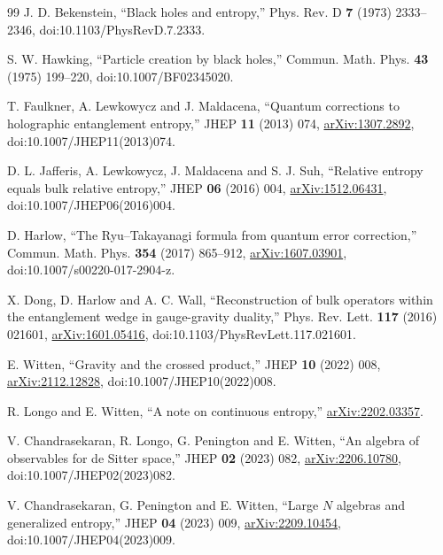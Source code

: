 \documentclass[12pt]{article}
\theoremstyle{definition}
\theoremstyle{remark}
\begin{document}
\begin{thebibliography}{99}
J. D. Bekenstein,
``Black holes and entropy,'' Phys. Rev. D \textbf{7} (1973) 2333--2346,
doi:10.1103/PhysRevD.7.2333.

S. W. Hawking,
``Particle creation by black holes,''
Commun. Math. Phys. \textbf{43} (1975) 199--220,
doi:10.1007/BF02345020.

T. Faulkner, A. Lewkowycz and J. Maldacena,
``Quantum corrections to holographic entanglement entropy,''
JHEP \textbf{11} (2013) 074,
\href{https://arxiv.org/abs/1307.2892}{arXiv:1307.2892},
doi:10.1007/JHEP11(2013)074.

D. L. Jafferis, A. Lewkowycz, J. Maldacena and S. J. Suh,
``Relative entropy equals bulk relative entropy,''
JHEP \textbf{06} (2016) 004,
\href{https://arxiv.org/abs/1512.06431}{arXiv:1512.06431},
doi:10.1007/JHEP06(2016)004.

D. Harlow,
``The Ryu--Takayanagi formula from quantum error correction,''
Commun. Math. Phys. \textbf{354} (2017) 865--912,
\href{https://arxiv.org/abs/1607.03901}{arXiv:1607.03901},
doi:10.1007/s00220-017-2904-z.

X. Dong, D. Harlow and A. C. Wall,
``Reconstruction of bulk operators within the entanglement wedge in
gauge-gravity duality,'' Phys. Rev. Lett. \textbf{117} (2016) 021601,
\href{https://arxiv.org/abs/1601.05416}{arXiv:1601.05416},
doi:10.1103/PhysRevLett.117.021601.

E. Witten,
``Gravity and the crossed product,''
JHEP \textbf{10} (2022) 008,
\href{https://arxiv.org/abs/2112.12828}{arXiv:2112.12828},
doi:10.1007/JHEP10(2022)008.

R. Longo and E. Witten,
``A note on continuous entropy,''
\href{https://arxiv.org/abs/2202.03357}{arXiv:2202.03357}.

V. Chandrasekaran, R. Longo, G. Penington and E. Witten,
``An algebra of observables for de Sitter space,''
JHEP \textbf{02} (2023) 082,
\href{https://arxiv.org/abs/2206.10780}{arXiv:2206.10780},
doi:10.1007/JHEP02(2023)082.

V. Chandrasekaran, G. Penington and E. Witten,
``Large \(N\) algebras and generalized entropy,''
JHEP \textbf{04} (2023) 009,
\href{https://arxiv.org/abs/2209.10454}{arXiv:2209.10454},
doi:10.1007/JHEP04(2023)009.

\end{thebibliography}
\end{document}
